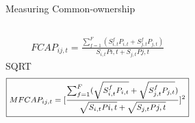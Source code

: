 \documentclass[handout]{beamer}
\begin{document}
%					
%					
%					
%					
%					
%					
%					
%					
%					
%					
%				

	\begin{frame}{Measuring Common-ownership}\label{measure}
				\begin{columns}
			\centering  
						\cite{AntonPolk}
								\begin{align*}
									\boxed{FCAP_{ij,t} = \frac{\sum_{f = 1}^{F} (S^f_{i,t}P_{i,t}+S^f_{j,t}P_{j,t})}{S_{i,t}P{i,t} + S_{j,t}P{j,t}}}
								\end{align*} 
			\centering
			SQRT
						\begin{align*}
						\footnotesize	\boxed{    MFCAP_{ij,t} =           [\frac{\sum_{f =1}^{F}(\sqrt{S^f_{i,t}P_{i,t}}+\sqrt{S^f_{j,t}P_{j,t}})}{\sqrt{S_{i,t}P{i,t}} + \sqrt{S_{j,t}P{j,t}}}]^2 }
						\end{align*}     				         
		\end{columns}
	\pause
		\begin{table}[htbp]
								\centering
								\resizebox{0.9\textwidth}{!}
								{
									  }          
							\end{table}
						\hfill
						\hyperlink{example}{}
	\end{frame}
	
\end{document}
